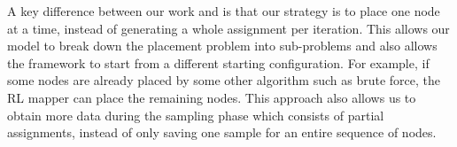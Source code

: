 
A key difference between our work and \cite{zhou2019gdp} is that our strategy is to place one node at a time, instead of generating a whole assignment per iteration. 
This allows our model to break down the placement problem into sub-problems and also allows the framework to start from a different starting configuration. 
For example, if some nodes are already placed by some other algorithm such as brute force, the RL mapper can place the remaining nodes. 
This approach also allows us to obtain more data during the sampling phase which consists of partial assignments, instead of only saving one sample for an entire sequence of nodes.